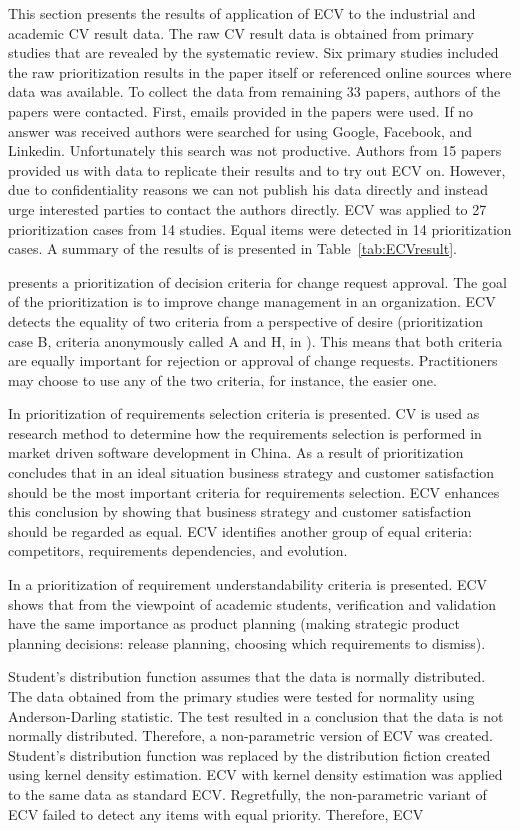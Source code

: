 This section presents the results of application of ECV to the industrial
and academic CV result data. The raw CV result data is obtained from
primary studies that are revealed by the systematic review. Six primary
studies included the raw prioritization results in the paper itself
or referenced online sources where data was available. To collect
the data from remaining 33 papers, authors of the papers were contacted.
First, emails provided in the papers were used. If no answer was received authors
were searched for using Google, Facebook, and Linkedin. Unfortunately
this search was not productive. Authors from 15 papers provided us with data to replicate their results and to try out ECV on.
However, due to confidentiality reasons we can not publish his data directly and instead urge interested parties to contact the authors directly.
ECV was applied to 27 prioritization cases from 14 studies.
Equal items were detected in 14 prioritization cases.
A summary of the results of is presented in Table~\ref{tab:ECVresult}.

\cite{Berander2006a} presents a prioritization of decision criteria
for change request approval. The goal of the prioritization is to
improve change management in an organization. ECV detects the equality
of two criteria from a perspective of desire (prioritization case
B, criteria anonymously called A and H, in \cite{Berander2006a}).
This means that both criteria are equally important for rejection
or approval of change requests. Practitioners may choose to use any
of the two criteria, for instance, the easier one.

In \cite{Hu2006} prioritization of requirements selection criteria
is presented. CV is used as research method to determine how the requirements
selection is performed in market driven software development in China.
As a result of prioritization \cite{Hu2006} concludes that in an
ideal situation business strategy and customer satisfaction should
be the most important criteria for requirements selection. ECV enhances
this conclusion by showing that business strategy and customer satisfaction
should be regarded as equal. ECV identifies another group of equal
criteria: competitors, requirements dependencies, and evolution.

In \cite{Svahnberg2008} a prioritization of requirement understandability
criteria is presented. ECV shows that from the viewpoint of academic
students, verification and validation have the same importance as
product planning (making strategic product planning decisions: release
planning, choosing which requirements to dismiss).

Student's distribution function assumes that the data is normally
distributed. The data obtained from the primary studies were tested
for normality using Anderson-Darling statistic. The test resulted
in a conclusion that the data is not normally distributed. Therefore,
a non-parametric version of ECV was created. Student's distribution
function was replaced by the distribution fiction created using kernel
density estimation. ECV with kernel density estimation was applied
to the same data as standard ECV. Regretfully, the non-parametric
variant of ECV failed to detect any items with equal priority. Therefore,
ECV 
